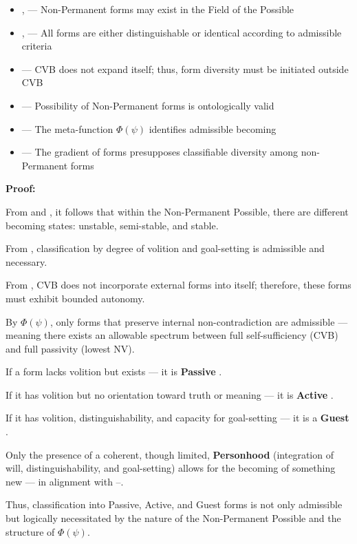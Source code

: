 \documentclass[12pt]{article}
\begin{document}
\begin{itemize}
\item \text{[4.2]}, \text{[4.3]} — Non-Permanent forms may exist in the Field of the Possible
\item \text{[9.1]}, \text{[9.2]} — All forms are either distinguishable or identical according to admissible criteria
\item \text{[13]} — CVB does not expand itself; thus, form diversity must be initiated outside CVB
\item \text{[14]} — Possibility of Non-Permanent forms is ontologically valid
\item \text{[11.1.1]} — The meta-function $\Phi(\psi)$ identifies admissible becoming
\item \text{[15]} — The gradient of forms presupposes classifiable diversity among non-Permanent forms
\end{itemize}

\textbf{Proof:}

From \text{[14]} and \text{[4.3]}, it follows that within the Non-Permanent Possible, there are different becoming states: unstable, semi-stable, and stable.

From \text{[9.1]}, classification by degree of volition and goal-setting is admissible and necessary.

From \text{[13]}, CVB does not incorporate external forms into itself; therefore, these forms must exhibit bounded autonomy.

By $\Phi(\psi)$, only forms that preserve internal non-contradiction are admissible — meaning there exists an allowable spectrum between full self-sufficiency (CVB) and full passivity (lowest NV).

If a form lacks volition but exists — it is \textbf{Passive} \text{[15.1]}.

If it has volition but no orientation toward truth or meaning — it is \textbf{Active} \text{[15.2]}.

If it has volition, distinguishability, and capacity for goal-setting — it is a \textbf{Guest} \text{[15.3]}.

Only the presence of a coherent, though limited, \textbf{Personhood} (integration of will, distinguishability, and goal-setting) allows for the becoming of something new — in alignment with \text{[17]}–\text{[18]}.

Thus, classification into Passive, Active, and Guest forms is not only admissible but logically necessitated by the nature of the Non-Permanent Possible and the structure of $\Phi(\psi)$.
\end{document}
